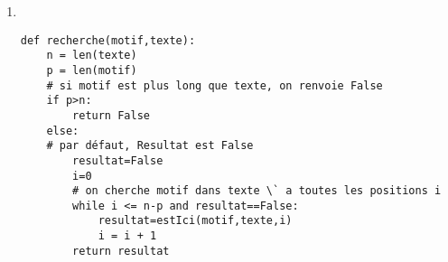 \begin{solution}
\begin{enumerate}
\item ~\\
\vspace{-0.7cm}
\begin{verbatim}
def recherche(motif,texte):
    n = len(texte)
    p = len(motif)
    # si motif est plus long que texte, on renvoie False
    if p>n:
        return False
    else:
    # par défaut, Resultat est False
        resultat=False
        i=0
        # on cherche motif dans texte \` a toutes les positions i 
        while i <= n-p and resultat==False:
            resultat=estIci(motif,texte,i)
            i = i + 1
        return resultat           
\end{verbatim}
\end{enumerate}
\end{solution}



